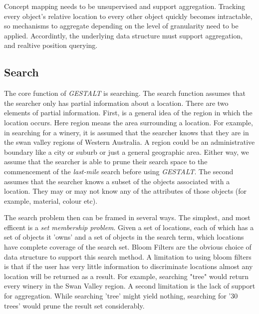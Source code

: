 Concept mapping needs to be unsupervised and support aggregation. Tracking every object's relative location to every other object quickly becomes intractable, so mechanisms to aggregate depending on the level of granularity need to be applied. 
Accordintly, the underlying data structure must support aggregation, and realtive position querying. 

\subsection{Search}
The core function of \textit{GESTALT} is searching. The search function assumes that the searcher only has partial information about a location. 
There are two elements of partial information. First, is a general idea of the region in which the location occurs. Here region means the area surrounding a location. 
For example, in searching for a winery, it is assumed that the searcher knows that they are in the swan valley regions of Western Australia. A region could be an administrative boundary like a city or suburb or just a general geographic area. 
Either way, we assume that the searcher is able to prune their search space to the commencement of the \textit{last-mile} search before using \textit{GESTALT}.
The second assumes that the searcher knows a subset of the objects associated with a location. They may or may not know any of the attributes of those objects (for example, material, colour etc). 

The search problem then can be framed in several ways. 
The simplest, and most efficent is a \textit{set membership problem}. Given a set of locations, each of which has a set of objects it 'owns' and a set of objects in the search term, which locations have complete coverage of the search set. Bloom Filters are the obvious choice of data structure to support this search method. 
A limitation to using bloom filters is that if the user has very little information to discriminate locations almost any location will be returned as a result. 
For example, searching "tree" would return every winery in the Swan Valley region. A second limitation is the lack of support for aggregation. While searching 'tree' might yield nothing, searching for '30 trees' would prune the result set considerably.

